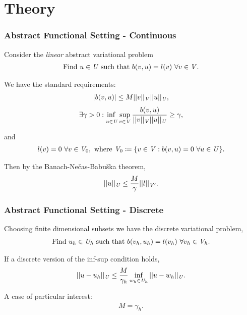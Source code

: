 \section{Theory}

\begin{frame}
\frametitle{Abstract Functional Setting - Continuous}

Consider the \emph{linear} abstract variational problem
\begin{align} \label{eq:bilinear_abstract_infinite}
\text{Find}\ u \in \mathit{{{U}}}\ \text{such that}\
b(v,u) = l(v)\ \forall v \in \mathit{{{V}}}.
\end{align}

We have the standard requirements:
\begin{align}
| b(v,u) | \le M
||v||_{\mathit{{{V}}}}
||u||_{\mathit{{{U}}}},
\end{align}
\begin{align} \label{eq:inf_sup_infinite}
\exists \gamma > 0 :
\adjustlimits\inf_{u\in\fspace{U}} \sup_{v\in\fspace{V}}
\frac{b(v,u)}{||v||_{\fspace{V}}||u||_{\fspace{U}}} \ge \gamma,
\end{align}

and
\begin{align}
l(v) = 0\ \forall v \in \mathit{{{V}}}_0,\ \text{where}\ \mathit{{{V}}}_0 \coloneqq \{v \in \mathit{{{V}}} : b(v,u) = 0\ \forall u
\in \mathit{{{U}}} \}.
\end{align}

Then by the Banach-Ne\v{c}as-Babu\v{s}ka theorem,
\begin{align}
||u||_{\mathit{{{U}}}} \le \frac{M}{\gamma} ||l||_{\mathit{{{V}}}'}.
\end{align}

\end{frame}

\begin{frame}
\frametitle{Abstract Functional Setting - Discrete}

Choosing finite dimensional subsets we have the discrete variational problem,
\begin{align} \label{eq:bilinear_abstract_finite}
\text{Find}\ u_h \in \mathit{{{U}}}_h\ \text{such that}\
b(v_h,u_h) = l(v_h)\ \forall v_h \in \mathit{{{V}}}_h.
\end{align}

If a discrete version of the inf-sup condition holds,
\begin{align} \label{eq:abstract_dpg_error}
||u-u_h||_{\mathit{{{U}}}} \le \frac{M}{\gamma_h} \inf_{w_h \in \mathit{{{U}}}_h} ||u-w_h||_{\mathit{{{U}}}}.
\end{align}

A case of particular interest:
\begin{align} \label{eq:equal_m_gamma}
M = \gamma_h.
\end{align}

\end{frame}

